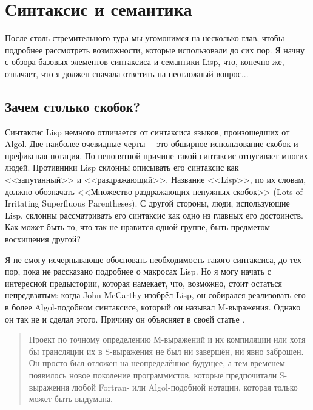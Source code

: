 \chapter{Синтаксис и семантика}
\label{ch:04}

\thispagestyle{empty}

После столь стремительного тура мы угомонимся на несколько глав, чтобы подробнее
рассмотреть возможности, которые использовали до сих пор. Я начну с обзора базовых
элементов синтаксиса и семантики Lisp, что, конечно же, означает, что я должен сначала
ответить на неотложный вопрос...

\section{Зачем столько скобок?}

Синтаксис Lisp немного отличается от синтаксиса языков, произошедших от Algol. Две
наиболее очевидные черты~-- это обширное использование скобок и префиксная нотация. По
непонятной причине такой синтаксис отпугивает многих людей. Противники Lisp склонны
описывать его синтаксис как <<запутанный>> и <<раздражающий>>. Название <<Lisp>>, по их словам,
должно обозначать <<Множество раздражающих ненужных скобок>> (Lots of Irritating Superfluous
Parentheses). С другой стороны, люди, использующие Lisp, склонны рассматривать его
синтаксис как одно из главных его достоинств. Как может быть то, что так не нравится одной
группе, быть предметом восхищения другой?

Я не смогу исчерпывающе обосновать необходимость такого синтаксиса, до тех пор, пока не
рассказано подробнее о макросах Lisp. Но я могу начать с интересной предыстории, которая
намекает, что, возможно, стоит остаться непредвзятым: когда John McCarthy изобрёл Lisp, он
собирался реализовать его в более Algol-подобном синтаксисе, который он называл
M-выражения. Однако он так не и сделал этого. Причину он объясняет в своей статье
.

\begin{quote}
  Проект по точному определению М-выражений и их компиляции или хотя бы трансляции их в
  S-выражения не был ни завершён, ни явно заброшен. Он просто был отложен на
  неопределённое будущее, а тем временем появилось новое поколение программистов, которые
  предпочитали S-выражения любой Fortran- или Algol-подобной нотации, которая только может
  быть выдумана.
\end{quote}

